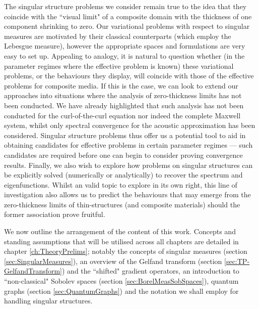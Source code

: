 The singular structure problems we consider remain true to the idea that they coincide with the ``visual limit" of a composite domain with the thickness of one component shrinking to zero.
Our variational problems with respect to singular measures are motivated by their classical counterparts (which employ the Lebesgue measure), however the appropriate spaces and formulations are very easy to set up.
Appealing to analogy, it is natural to question whether (in the parameter regimes where the effective problem is known) these variational problems, or the behaviours they display, will coincide with those of the effective problems for composite media.
If this is the case, we can look to extend our approaches into situations where the analysis of zero-thickness limits has not been conducted.
We have already highlighted that such analysis has not been conducted for the curl-of-the-curl equation nor indeed the complete Maxwell system, whilst only spectral convergence for the acoustic approximation has been considered.
Singular structure problems thus offer us a potential tool to aid in obtaining candidates for effective problems in certain parameter regimes --- such candidates are required before one can begin to consider proving convergence results.
Finally, we also wish to explore how problems on singular structures can be explicitly solved (numerically or analytically) to recover the spectrum and eigenfunctions.
Whilst an valid topic to explore in its own right, this line of investigation also allows us to predict the behaviours that may emerge from the zero-thickness limits of thin-structures (and composite materials) should the former association prove fruitful.

We now outline the arrangement of the content of this work.
Concepts and standing assumptions that will be utilised across all chapters are detailed in chapter \ref{ch:TheoryPrelims}; notably the concepts of singular measures (section \ref{sec:SingularMeasures}), an overview of the Gelfand transform (section \ref{sec:TP-GelfandTransform}) and the ``shifted" gradient operators, an introduction to ``non-classical" Sobolev spaces (section \ref{sec:BorelMeasSobSpaces}), quantum graphs (section \ref{sec:QuantumGraphs}) and the notation we shall employ for handling singular structures.

